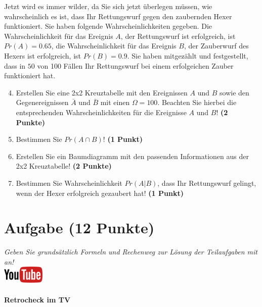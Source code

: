 \documentclass[a4paper, 9pt]{scrartcl}\usepackage[]{graphicx}\usepackage[]{xcolor}
\begin{document}
Jetzt wird es immer wilder, da Sie sich jetzt {\"u}berlegen m{\"u}ssen, wie
wahrscheinlich es ist, dass Ihr Rettungswurf gegen den zaubernden Hexer
funktioniert. Sie haben folgende Wahrscheinlichkeiten gegeben. Die
Wahrscheinlichkeit f{\"u}r das Ereignis $A$, der Rettungswurf ist erfolgreich,
ist $Pr(A) = 0.65$, die Wahrscheinlichkeit f{\"u}r das Ereignis $B$,
der Zauberwurf des Hexers ist erfolgreich, ist $Pr(B) = 0.9$. Sie
haben mitgez{\"a}hlt und festgestellt, dass in $50$ von 100 F{\"a}llen
Ihr Rettungswurf bei einem erfolgeichen Zauber funktioniert hat.  

\begin{enumerate}
  \setcounter{enumi}{3}
\item Erstellen Sie eine 2x2 Kreuztabelle mit den Ereignissen $A$ und $B$
  sowie den Gegenereignissen $\bar{A}$ und $\bar{B}$ mit einen
  $\Omega = 100$. Beachten Sie hierbei die entsprechenden
  Wahrscheinlichkeiten f{\"u}r die Ereignisse $A$ und $B$! \textbf{(2 Punkte)}
\item Bestimmen Sie $Pr(A \cap B)$! \textbf{(1 Punkt)}
\item Erstellen Sie ein Baumdiagramm mit den passenden Informationen aus der 2x2
  Kreuztabelle! \textbf{(2 Punkte)}
\item Bestimmen Sie Wahrscheinlichkeit $Pr(A|B)$, dass Ihr Rettungswurf gelingt, wenn
  der Hexer erfolgreich gezaubert hat! \textbf{(1 Punkt)}
\end{enumerate}

  
\clearpage

\section{Aufgabe \hfill (12 Punkte)}

\textit{Geben Sie grunds{\"a}tzlich Formeln und Rechenweg zur L{\"o}sung der
  Teilaufgaben mit an!} \\[1Ex]

\hfill\href{https://youtu.be/9DQKaXdxT_g}{\includegraphics[width =
  2cm]{img/youtube}} %
\hspace{2Ex}

\paragraph{Retrocheck im TV}
\end{document}

